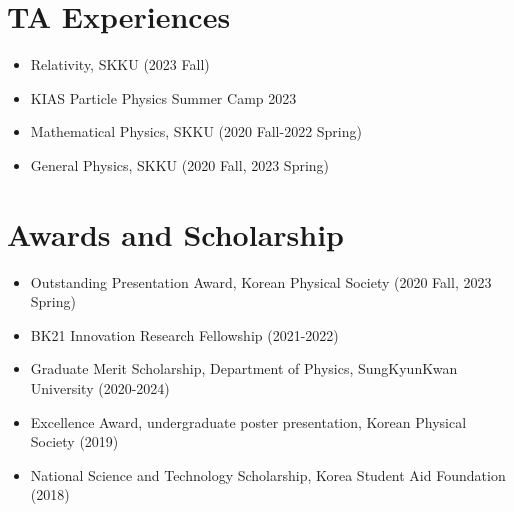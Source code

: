 \documentclass{article}
\begin{document}
\section{TA Experiences}
    \begin{itemize}
        \item Relativity, SKKU (2023 Fall)
        \item KIAS Particle Physics Summer Camp 2023
    	\item Mathematical Physics, SKKU (2020 Fall-2022 Spring)
    	\item General Physics, SKKU (2020 Fall, 2023 Spring)
    \end{itemize}


\section{Awards and Scholarship}
\begin{itemize}
    \item Outstanding Presentation Award, Korean Physical Society (2020 Fall, 2023 Spring)
	\item BK21 Innovation Research Fellowship (2021-2022)
	\item Graduate Merit Scholarship, Department of Physics, SungKyunKwan University (2020-2024)
	\item Excellence Award, undergraduate poster presentation, Korean Physical Society (2019)
	\item National Science and Technology Scholarship, Korea Student Aid Foundation (2018)
\end{itemize}
\end{document}
